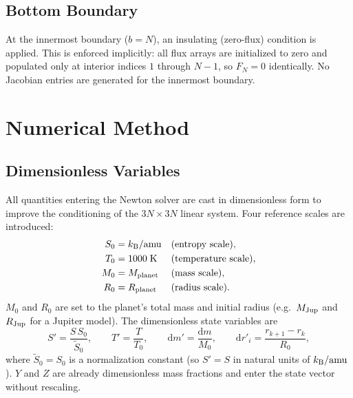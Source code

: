 \documentclass{aastex631}
\newcommand{\dd}{\mathrm{d}}
\newcommand{\kbbar}{k_{\rm B}/\mathrm{amu}}
\begin{document}
\subsection{Bottom Boundary}\label{sec:bc_bottom}

At the innermost boundary ($b=N$), an insulating (zero-flux) condition
is applied.  This is enforced implicitly: all flux arrays are initialized
to zero and populated only at interior indices $1$ through $N-1$, so
$F_N = 0$ identically.  No Jacobian entries are generated for the
innermost boundary.

\section{Numerical Method}\label{sec:numerics}

\subsection{Dimensionless Variables}\label{sec:dimless}

All quantities entering the Newton solver are cast in dimensionless
form to improve the conditioning of the $3N\times 3N$ linear system.
Four reference scales are introduced:
\begin{align}
  S_0 &= \kbbar
       &&\text{(entropy scale)},
  \label{eq:S0}\\
  T_0 &= 1000\;\mathrm{K}
       &&\text{(temperature scale)},
  \label{eq:T0}\\
  M_0 &= M_{\rm planet}
       &&\text{(mass scale)},
  \label{eq:M0}\\
  R_0 &= R_{\rm planet}
       &&\text{(radius scale)}.
  \label{eq:R0}
\end{align}
$M_0$ and $R_0$ are set to the planet's total mass and initial radius
(e.g.\ $M_{\rm Jup}$ and $R_{\rm Jup}$ for a Jupiter model).
The dimensionless state variables are
\begin{equation}\label{eq:dimless_vars}
  S' = \frac{S\,S_0}{\tilde{S}_0},
  \qquad
  T' = \frac{T}{T_0},
  \qquad
  \dd m' = \frac{\dd m}{M_0},
  \qquad
  \dd r'_i = \frac{r_{k+1} - r_k}{R_0},
\end{equation}
where $\tilde{S}_0 = S_0$ is a normalization constant (so $S' = S$ in
natural units of $\kbbar$).  $Y$ and $Z$ are already dimensionless
mass fractions and enter the state vector without rescaling.
\end{document}
